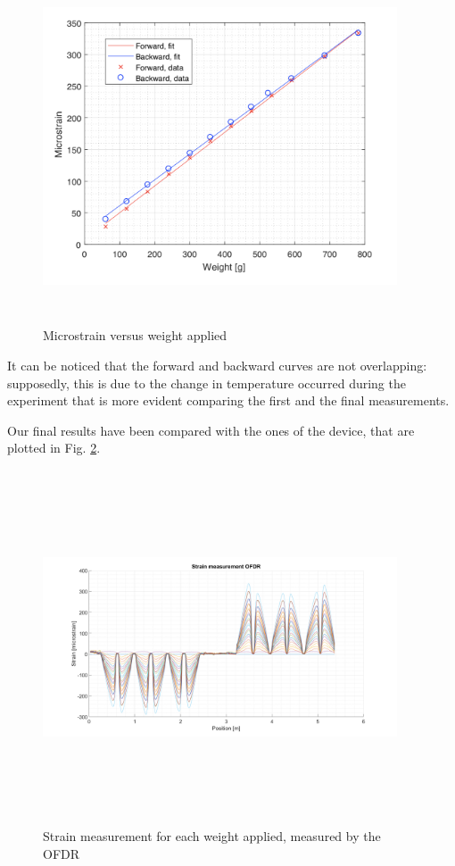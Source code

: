 \begin{figure}[H]
	\centering
	\includegraphics[height=10.5cm, width=10.5cm, keepaspectratio]{img/sensitivity.png}
	\caption{Microstrain versus weight applied}\label{fig:sensitivity}
\end{figure}

It can be noticed that the forward and backward curves are not overlapping: supposedly, this is due to the change in temperature occurred during the experiment that is more evident comparing the first and the final measurements.


Our final results have been compared with the ones of the device, that are plotted in Fig. \ref{fig:OFDR}.

\begin{figure}[H]
	\centering
	\includegraphics[height=10.5cm, width=10.5cm, keepaspectratio]{img/OFDR.png}
	\caption{Strain measurement for each weight applied, measured by the OFDR}\label{fig:OFDR}
\end{figure}

